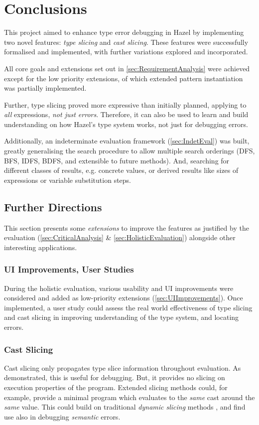 \chapter{Conclusions}\label{chap:Conclusions}
This project aimed to enhance type error debugging in Hazel by implementing two novel features: \textit{type slicing} and \textit{cast slicing}. These features were successfully formalised and implemented, with further variations explored and incorporated.

All core goals and extensions set out in \cref{sec:RequirementAnalysis} were achieved except for the low priority extensions, of which extended pattern instantiation was partially implemented.

Further, type slicing proved more expressive than initially planned, applying to \textit{all} expressions, \textit{not just errors}. Therefore, it can also be used to learn and build understanding on how Hazel's type system works, not just for debugging errors. 

Additionally, an indeterminate evaluation framework (\cref{sec:IndetEval}) was built, greatly generalising the search procedure to allow multiple search orderings (DFS, BFS, IDFS, BDFS, and extensible to future methods). And, searching for different classes of results, e.g. concrete values, or derived results like sizes of expressions or variable substitution steps.
\section{Further Directions}
This section presents some \textit{extensions} to improve the features as justified by the evaluation (\cref{sec:CriticalAnalysis} \& \ref{sec:HolisticEvaluation}) alongside other interesting {applications}. 

\subsection{UI Improvements, User Studies}
During the holistic evaluation, various usability and UI improvements were considered and added as low-priority extensions (\cref{sec:UIImprovements}). Once implemented, a user study could assess the real world effectiveness of type slicing and cast slicing in improving understanding of the type system, and locating errors.

\subsection{Cast Slicing}
Cast slicing only propagates type slice information throughout evaluation. As demonstrated, this is useful for debugging. But, it provides no slicing on execution properties of the program. Extended slicing methods could, for example, provide a minimal program which evaluates to the \textit{same} cast around the \textit{same} value. This could build on traditional \textit{dynamic slicing} methods \cite{DynProgSlice, FunctionalProgExplain}, and find use also in debugging \textit{semantic} errors.

